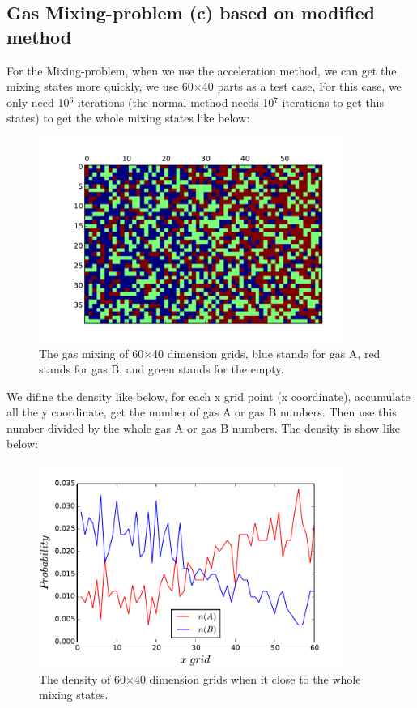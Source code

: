 \documentclass[11pt, oneside]{article}  	%
\begin{document}
\subsection{Gas Mixing-problem (c) based on modified method}

For the Mixing-problem, when we use the acceleration method, we can get the mixing states more quickly, we use 60$\times$40 parts as a test case, For this case, we only need 10$^6$ iterations (the normal method needs 10$^7$ iterations to get this states) to get the whole mixing states like below:
\begin{figure}[htbp]
\begin{center}
\includegraphics[width=10cm]{M15-6}
\caption{The gas mixing of 60$\times$40 dimension grids, blue stands for gas A, red stands for gas B, and green stands for the empty.}
\label{default}
\end{center}
\end{figure}


We difine the density like below, for each x grid point (x coordinate), accumulate all the y coordinate, get the number of gas A or gas B numbers. Then use this number divided by the whole gas A or gas B numbers. The density is show like below:
\begin{figure}[htbp]
\begin{center}
\includegraphics[width=10cm]{D15-6}
\caption{The density of 60$\times$40 dimension grids when it close to the whole mixing states. }
\label{default}
\end{center}
\end{figure}
\end{document}
